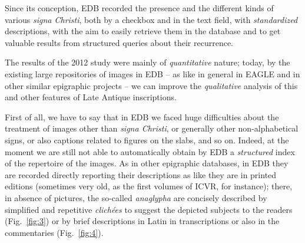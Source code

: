 \documentclass[amsthm,ebook]{saparticle}
\begin{document}
Since its conception, EDB recorded the presence and the different kinds of various \emph{signa Christi}, both by a checkbox and
in the text field, with \emph{standardized} descriptions, with the aim to easily retrieve them in the database and to get
valuable results from structured queries about their recurrence.

The results of the 2012 study were mainly of \emph{quantitative} nature; today, by the existing large repositories of images in
EDB – as like in general in EAGLE and in other similar epigraphic projects – we can improve the \emph{qualitative} analysis of
this and other features of Late Antique inscriptions.

First of all, we have to say that in EDB we faced huge difficulties about the treatment of images other than \emph{signa
Christi}, or generally other non-alphabetical signs, or also captions related to figures on the slabs, and so on.
Indeed, at the moment we are still not able to automatically obtain by EDB a \emph{structured} index of the repertoire of the
images. As in other epigraphic databases, in EDB they are recorded directly reporting their descriptions as like they
are in printed editions (sometimes very old, as the first volumes of ICVR, for instance); there, in absence of
pictures, the so-called \emph{anaglypha} are concisely described by simplified and repetitive \emph{clichées} to suggest the depicted
subjects to the readers (Fig.~\ref{fig:3}) or by brief descriptions in Latin in transcriptions or also in the commentaries (Fig.~\ref{fig:4}). 
\end{document}

